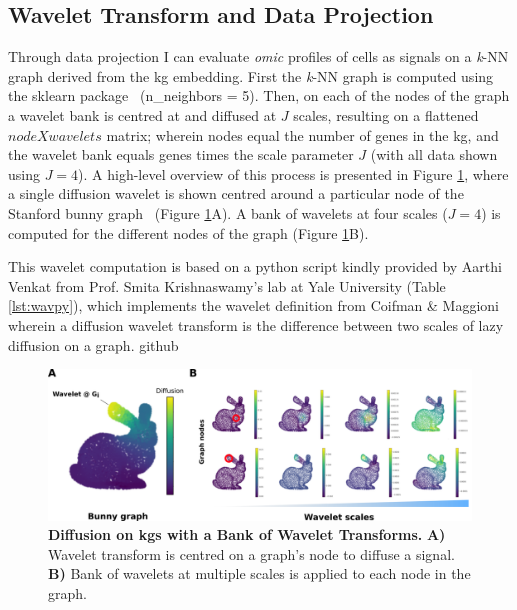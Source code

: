 \subsection{Wavelet Transform and Data Projection}

Through data projection I can evaluate \emph{omic} profiles of cells as signals on a \emph{k}-NN graph derived from the \acrshort{kg} embedding. First the \emph{k}-NN graph is computed using the sklearn package~\cite{pedregosa_scikit-learn_2011} (n\_neighbors = 5). Then, on each of the nodes of the graph a wavelet bank is centred at and diffused at \(J\) scales, resulting on a flattened \(node X wavelets\) matrix; wherein nodes equal the number of genes in the \acrshort{kg}, and the wavelet bank equals genes times the scale parameter \(J\) (with all data shown using \(J = 4\)). A high-level overview of this process is presented in Figure \ref{fig:2wav}, where a single diffusion wavelet is shown centred around a particular node of the Stanford bunny graph~\cite{turk_zippered_1994} (Figure \ref{fig:2wav}A). A bank of wavelets at four scales (\(J = 4\)) is computed for the different nodes of the graph (Figure \ref{fig:2wav}B). 

This wavelet computation is based on a python script kindly provided by Aarthi Venkat from Prof. Smita Krishnaswamy's lab at Yale University (Table \ref{lst:wavpy}), which implements the wavelet definition from Coifman \& Maggioni~\cite{coifman_diffusion_2006} wherein a diffusion wavelet transform is the difference between two scales of lazy diffusion on a graph.
github

\begin{figure}
    \centering
    \includegraphics{02methods/figs/2KG_wav.png}
    \caption{\textbf{Diffusion on \acrshort{kg}s with a Bank of Wavelet Transforms.} \textbf{A)} Wavelet transform is centred on a graph's node to diffuse a signal. \textbf{B)} Bank of wavelets at multiple scales is applied to each node in the graph.}
    \label{fig:2wav}
\end{figure}

